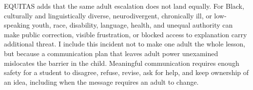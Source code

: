 EQUITAS adds that the same adult escalation does not land equally. For Black, culturally and linguistically diverse, neurodivergent, chronically ill, or low-speaking youth, race, disability, language, health, and unequal authority can make public correction, visible frustration, or blocked access to explanation carry additional threat. I include this incident not to make one adult the whole lesson, but because a communication plan that leaves adult power unexamined mislocates the barrier in the child. Meaningful communication requires enough safety for a student to disagree, refuse, revise, ask for help, and keep ownership of an idea, including when the message requires an adult to change.
